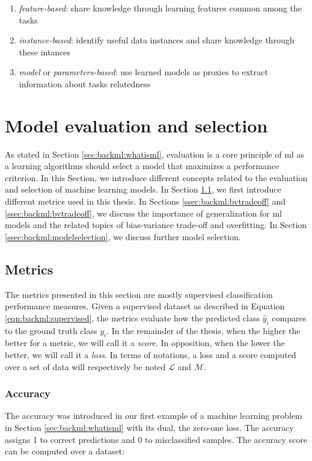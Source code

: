 \begin{enumerate}
  \item \textit{feature-based}: share knowledge through learning features common among the tasks
  \item \textit{instance-based}: identify useful data instances and share knowledge through these intances
  \item \textit{model} or \textit{parameters-based}: use learned models as proxies to extract information about tasks relatedness
\end{enumerate}


\section{Model evaluation and selection}

As stated in Section \ref{sec:backml:whatisml}, evaluation is a core principle of \acrlong{ml} as a learning algorithms should select a model that maximizes a performance criterion. In this Section, we introduce different concepts related to the evaluation and selection of machine learning models. In Section \ref{ssec:backml:metrics}, we first introduce different metrics used in this thesis. In Sections \ref{ssec:backml:bvtradeoff} and \ref{ssec:backml:bvtradeoff}, we discuss the importance of generalization for \acrlong{ml} models and the related topics of bias-variance trade-off and overfitting. In Section \ref{ssec:backml:modelselection}, we discuss further model selection.

\subsection{Metrics}
\label{ssec:backml:metrics}

The metrics presented in this section are mostly supervised classification performance measures. Given a supervised dataset as described in Equation \ref{eqn:backml:supervised}, the metrics evaluate how the predicted class $\hat{y}_i$ compares to the ground truth class $y_i$. In the remainder of the thesis, when the higher the better for a metric, we will call it a \textit{score}. In opposition, when the lower the better, we will call it a \textit{loss}. In terms of notations, a loss and a score computed over a set of data will respectively be noted $\mathcal{L}$ and $\mathcal{M}$.

\subsubsection{Accuracy}
\label{sssec:backml:metric:acc}
The accuracy was introduced in our first example of a machine learning problem in Section \ref{sec:backml:whatisml} with its dual, the zero-one loss. The accuracy assigns 1 to correct predictions and 0 to misclassified samples. The accuracy score can be computed over a dataset:

